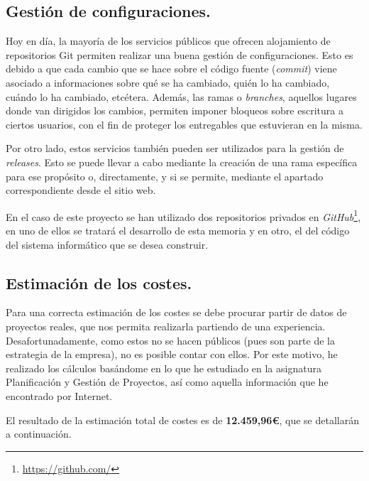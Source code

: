 \documentclass[twoside]{report}
\begin{document}
\subsection{Gestión de configuraciones.}

Hoy en día, la mayoría de los servicios públicos que ofrecen alojamiento de repositorios Git permiten realizar una buena gestión de configuraciones. Esto es debido a que cada cambio que se hace sobre el código fuente (\textit{commit}) viene asociado a informaciones sobre qué se ha cambiado, quién lo ha cambiado, cuándo lo ha cambiado, etcétera. Además, las ramas o \textit{branches}, aquellos lugares donde van dirigidos los cambios, permiten imponer bloqueos sobre escritura a ciertos usuarios, con el fin de proteger los entregables que estuvieran en la misma.

Por otro lado, estos servicios también pueden ser utilizados para la gestión de \textit{releases}. Esto se puede llevar a cabo mediante la creación de una rama específica para ese propósito o, directamente, y si se permite, mediante el apartado correspondiente desde el sitio web.

En el caso de este proyecto se han utilizado dos repositorios privados en \textit{GitHub}\footnote{\url{https://github.com/}}, en uno de ellos se tratará el desarrollo de esta memoria y en otro, el del código del sistema informático que se desea construir.

\subsection{Estimación de los costes.}

Para una correcta estimación de los costes se debe procurar partir de datos de proyectos reales, que nos permita realizarla partiendo de una experiencia. Desafortunadamente, como estos no se hacen públicos (pues son parte de la estrategia de la empresa), no es posible contar con ellos. Por este motivo, he realizado los cálculos basándome en lo que he estudiado en la asignatura \cite{pgptema2} Planificación y Gestión de Proyectos, así como aquella información que he encontrado por Internet.

El resultado de la estimación total de costes es de \textbf{12.459,96\euro}, que se detallarán a continuación.
\end{document}
